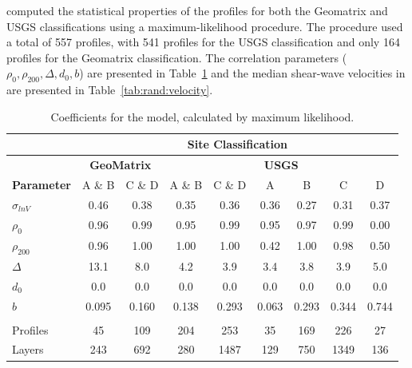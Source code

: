 \documentclass[12pt,oneside]{book}
\begin{document}
\citet{toro:95} computed the statistical properties of the profiles for both the Geomatrix and USGS
classifications using a maximum-likelihood procedure.  The procedure used a total of 557 profiles,
with 541 profiles for the USGS classification and only 164 profiles for the Geomatrix
classification.  The correlation parameters ($\rho_0, \rho_{200}, \Delta, d_0, b$) are presented in
Table~\ref{tab:rand:coeffs} and the median shear-wave velocities in are presented in
Table~\ref{tab:rand:velocity}.

\begin{table}[tbp]
    \centering
    \begin{tabular}{lcc|cccccc}
        \hline\hline
        & \multicolumn{8}{c}{\textbf{Site Classification}} \\
        \hline
        & \multicolumn{2}{c|}{\textbf{GeoMatrix}}
        & \multicolumn{6}{c}{\textbf{USGS}} \\
        \textbf{Parameter} & A \& B & C \& D & A \& B & C \& D &
        A & B & C & D  \\
        \hline
        $\sigma_{ln V}$ & 0.46 & 0.38 & 0.35 & 0.36 & 0.36 & 0.27 & 0.31 & 0.37 \\
        $\rho_0$  & 0.96 & 0.99 & 0.95 & 0.99 & 0.95 & 0.97 & 0.99 & 0.00 \\
        $\rho_{200}$  & 0.96 & 1.00 & 1.00 & 1.00 & 0.42 & 1.00 & 0.98 & 0.50 \\
        $\Delta$  & 13.1 & 8.0 & 4.2 & 3.9 & 3.4 & 3.8 & 3.9 & 5.0 \\
        $d_0$  &  0.0 & 0.0 & 0.0 & 0.0 & 0.0 & 0.0 & 0.0 & 0.0 \\
        $b$  & 0.095 & 0.160 & 0.138 & 0.293 & 0.063 & 0.293 & 0.344 & 0.744 \\
        \\
        Profiles  & 45  & 109 & 204 & 253   & 35  & 169 & 226  & 27 \\
        Layers  & 243 & 692 & 280 & 1487  & 129 & 750 & 1349 & 136 \\
        \hline\hline
    \end{tabular}
    \caption{Coefficients for the \citet{toro:95} model, calculated by maximum likelihood.}
    \label{tab:rand:coeffs}
\end{table}
\end{document}
